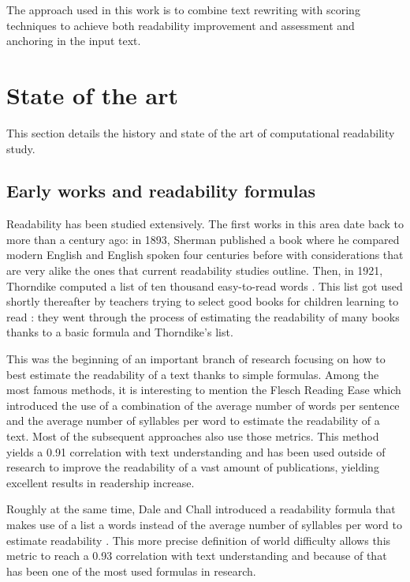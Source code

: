 \documentclass[a4paper, 11pt, onepage]{scrreprt}
\begin{document}
The approach used in this work is to combine text rewriting with
scoring techniques to achieve both readability improvement and
assessment and anchoring in the input text.

\chapter{State of the art}
\label{sec:sota}

This section details the history and state of the art of computational
readability study.

\section{Early works and readability formulas}
\label{sec:early-works-and-formulas}
Readability has been studied extensively. The first works in this area
date back to more than a century ago: in 1893, Sherman published a
book \cite{sherman1893analytics} where he compared modern English and
English spoken four centuries before with considerations that are very
alike the ones that current readability studies outline. Then, in
1921, Thorndike computed a list of ten thousand easy-to-read words
\cite{thorndike1921teacher}. This list got used shortly thereafter by
teachers trying to select good books for children learning to read
\cite{lively1923method}: they went through the process of estimating
the readability of many books thanks to a basic formula and
Thorndike's list.

This was the beginning of an important branch of research focusing on
how to best estimate the readability of a text thanks to simple
formulas. Among the most famous methods, it is interesting to mention
the Flesch Reading Ease \cite{flesch1948new} which introduced the use
of a combination of the average number of words per sentence and the
average number of syllables per word to estimate the readability of a
text. Most of the subsequent approaches also use those metrics. This
method yields a 0.91 correlation with text understanding and has been
used outside of research to improve the readability of a vast amount
of publications, yielding excellent results in readership increase.

Roughly at the same time, Dale and Chall introduced a readability
formula that makes use of a list a words instead of the average number
of syllables per word to estimate readability
\cite{dale1948formula}. This more precise definition of world
difficulty allows this metric to reach a 0.93 correlation with text
understanding and because of that has been one of the most used
formulas in research.
\end{document}
